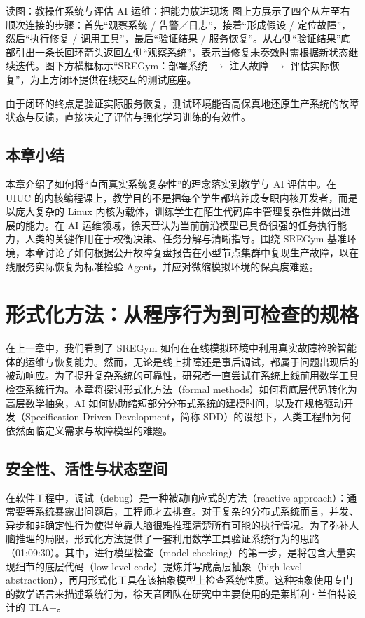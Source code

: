 \documentclass[UTF8,a4paper,11pt,fontset=fandol]{ctexart}
\begin{document}
\begin{knowledgebox}{读图：教操作系统与评估 AI 运维：把能力放进现场}
图上方展示了四个从左至右顺次连接的步骤：首先“观察系统 / 告警／日志”，接着“形成假设 / 定位故障”，然后“执行修复 / 调用工具”，最后“验证结果 / 服务恢复”。从右侧“验证结果”底部引出一条长回环箭头返回左侧“观察系统”，表示当修复未奏效时需根据新状态继续迭代。图下方横框标示“SREGym：部署系统 \ensuremath{\rightarrow} 注入故障 \ensuremath{\rightarrow} 评估实际恢复”，为上方闭环提供在线交互的测试底座。
\end{knowledgebox}
由于闭环的终点是验证实际服务恢复，测试环境能否高保真地还原生产系统的故障状态与反馈，直接决定了评估与强化学习训练的有效性。
\subsection{本章小结}
本章介绍了如何将“直面真实系统复杂性”的理念落实到教学与 AI 评估中。在 UIUC 的内核编程课上，教学目的不是把每个学生都培养成专职内核开发者，而是以庞大复杂的 Linux 内核为载体，训练学生在陌生代码库中管理复杂性并做出进展的能力。在 AI 运维领域，徐天音认为当前前沿模型已具备很强的任务执行能力，人类的关键作用在于权衡决策、任务分解与清晰指导。围绕 SREGym 基准环境，本章讨论了如何根据公开故障复盘报告在小型节点集群中复现生产故障，以在线服务实际恢复为标准检验 Agent，并应对微缩模拟环境的保真度难题。
\section{形式化方法：从程序行为到可检查的规格}
在上一章中，我们看到了 SREGym 如何在在线模拟环境中利用真实故障检验智能体的运维与恢复能力。然而，无论是线上排障还是事后调试，都属于问题出现后的被动响应。为了提升复杂系统的可靠性，研究者一直尝试在系统上线前用数学工具检查系统行为。本章将探讨形式化方法（formal methods）如何将底层代码转化为高层数学抽象，AI 如何协助缩短部分分布式系统的建模时间，以及在规格驱动开发（Specification-Driven Development，简称 SDD）的设想下，人类工程师为何依然面临定义需求与故障模型的难题。
\subsection{安全性、活性与状态空间}
在软件工程中，调试（debug）是一种被动响应式的方法（reactive approach）：通常要等系统暴露出问题后，工程师才去排查。对于复杂的分布式系统而言，并发、异步和非确定性行为使得单靠人脑很难推理清楚所有可能的执行情况。为了弥补人脑推理的局限，形式化方法提供了一套利用数学工具验证系统行为的思路（01:09:30）。其中，进行模型检查（model checking）的第一步，是将包含大量实现细节的底层代码（low-level code）提炼并写成高层抽象（high-level abstraction），再用形式化工具在该抽象模型上检查系统性质。这种抽象使用专门的数学语言来描述系统行为，徐天音团队在研究中主要使用的是莱斯利·兰伯特设计的 TLA+。
\end{document}
